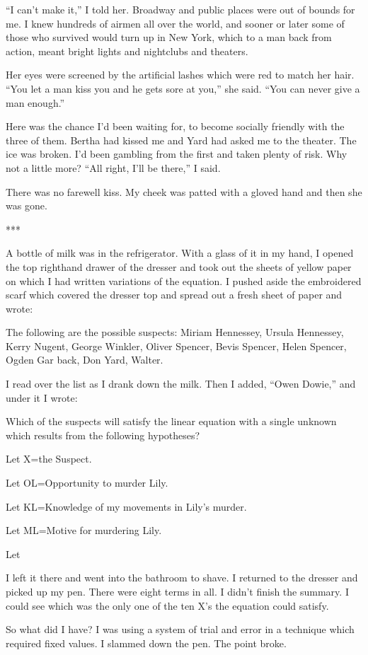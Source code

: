 \documentclass{novel}
\begin{document}
“I can’t make it,” I told her. Broadway and public places were out of bounds for me. I knew hundreds of airmen all over the world, and sooner or later some of those who survived would turn up in New York, which to a man back from action, meant bright lights and nightclubs and theaters.

Her eyes were screened by the artificial lashes which were red to match her hair. “You let a man kiss you and he gets sore at you,” she said. “You can never give a man enough.”

Here was the chance I’d been waiting for, to become socially friendly with the three of them. Bertha had kissed me and Yard had asked me to the theater. The ice was broken. I’d been gambling from the first and taken plenty of risk. Why not a little more? “All right, I’ll be there,” I said.

There was no farewell kiss. My cheek was patted with a gloved hand and then she was gone.

***

A bottle of milk was in the refrigerator. With a glass of it in my hand, I opened the top righthand drawer of the dresser and took out the sheets of yellow paper on which I had written variations of the equation. I pushed aside the embroidered scarf which covered the dresser top and spread out a fresh sheet of paper and wrote:

The following are the possible suspects: Miriam Hennessey, Ursula Hennessey, Kerry Nugent, George Winkler, Oliver Spencer, Bevis Spencer, Helen Spencer, Ogden Gar back, Don Yard, Walter.

I read over the list as I drank down the milk. Then I added, “Owen Dowie,” and under it I wrote:

Which of the suspects will satisfy the linear equation with a single unknown which results from the following hypotheses?

Let X=the Suspect.

Let OL=Opportunity to murder Lily.

Let KL=Knowledge of my movements in Lily’s murder.

Let ML=Motive for murdering Lily.

Let

I left it there and went into the bathroom to shave. I returned to the dresser and picked up my pen. There were eight terms in all. I didn’t finish the summary. I could see which was the only one of the ten X’s the equation could satisfy.

So what did I have? I was using a system of trial and error in a technique which required fixed values. I slammed down the pen. The point broke.
\end{document}
